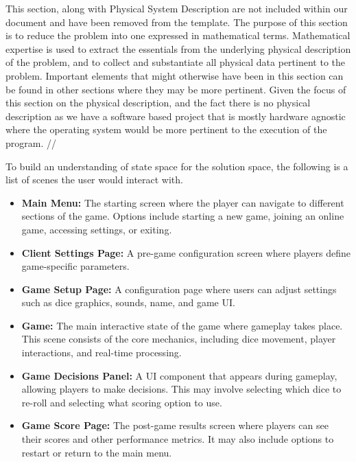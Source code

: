 This section, along with Physical System Description are not included within our document and have been removed from the template. The purpose of this section is to reduce the problem into one expressed in mathematical terms. Mathematical expertise is used to extract the essentials from the underlying physical description of the problem, and to collect and substantiate all physical data pertinent to the problem. Important elements that might otherwise have been in this section can be found in other sections where they may be more pertinent. Given the focus of this section on the physical description, and the fact there is no physical description as we have a software based project that is mostly hardware agnostic where the operating system would be more pertinent to the execution of the program. //

To build an understanding of state space for the solution space, the following is a list of scenes the user would interact with.
\begin{itemize}
  \item \textbf{Main Menu:} The starting screen where the player can navigate to different sections of the game. Options include starting a new game, joining an online game, accessing settings, or exiting.
  \item \textbf{Client Settings Page:} A pre-game configuration screen where players define game-specific parameters.
  \item \textbf{Game Setup Page:} A configuration page where users can adjust settings such as dice graphics, sounds, name, and game UI.
  \item \textbf{Game:} The main interactive state of the game where gameplay takes place. This scene consists of the core mechanics, including dice movement, player interactions, and real-time processing.
  \item \textbf{Game Decisions Panel:} A UI component that appears during gameplay, allowing players to make decisions. This may involve selecting which dice to re-roll and selecting what scoring option to use.
  \item \textbf{Game Score Page:} The post-game results screen where players can see their scores and other performance metrics. It may also include options to restart or return to the main menu.
\end{itemize}




\iffalse
{}


